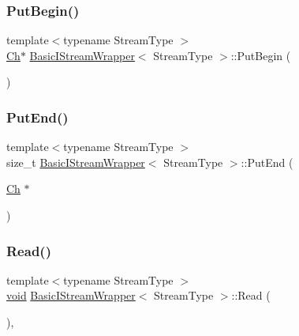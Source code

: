 \mbox{\label{classBasicIStreamWrapper_a62a3fc10b009ea231fb9d2dc958c539c}} 
\subsubsection{\texorpdfstring{Put\+Begin()}{PutBegin()}}
{\footnotesize\ttfamily template$<$typename Stream\+Type $>$ \\
\hyperlink{classBasicIStreamWrapper_a88e4288ecdaa0d31ddf4e5917b9aa8d7}{Ch}$\ast$ \hyperlink{classBasicIStreamWrapper}{Basic\+I\+Stream\+Wrapper}$<$ Stream\+Type $>$\+::Put\+Begin (\begin{DoxyParamCaption}{ }\end{DoxyParamCaption})\hspace{0.3cm}{\ttfamily [inline]}}

\mbox{\label{classBasicIStreamWrapper_ab2ead53490207a1cb0bdd674a03957f3}} 
\subsubsection{\texorpdfstring{Put\+End()}{PutEnd()}}
{\footnotesize\ttfamily template$<$typename Stream\+Type $>$ \\
size\+\_\+t \hyperlink{classBasicIStreamWrapper}{Basic\+I\+Stream\+Wrapper}$<$ Stream\+Type $>$\+::Put\+End (\begin{DoxyParamCaption}\item[{\hyperlink{classBasicIStreamWrapper_a88e4288ecdaa0d31ddf4e5917b9aa8d7}{Ch} $\ast$}]{ }\end{DoxyParamCaption})\hspace{0.3cm}{\ttfamily [inline]}}

\mbox{\label{classBasicIStreamWrapper_a14f7e115ff06dbf8dda561d156641633}} 
\subsubsection{\texorpdfstring{Read()}{Read()}}
{\footnotesize\ttfamily template$<$typename Stream\+Type $>$ \\
\hyperlink{imgui__impl__opengl3__loader_8h_ac668e7cffd9e2e9cfee428b9b2f34fa7}{void} \hyperlink{classBasicIStreamWrapper}{Basic\+I\+Stream\+Wrapper}$<$ Stream\+Type $>$\+::Read (\begin{DoxyParamCaption}{ }\end{DoxyParamCaption})\hspace{0.3cm}{\ttfamily [inline]}, {\ttfamily [private]}}

